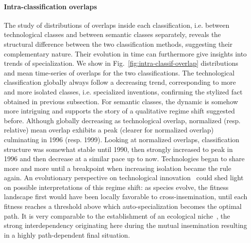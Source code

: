 \documentclass[12pt,twoside,a4paper]{article}
\begin{document}
\paragraph{Intra-classification overlaps}

The study of distributions of overlaps inside each classification, i.e. between technological classes and between semantic classes separately, reveals the structural difference between the two classification methods, suggesting their complementary nature. Their evolution in time can furthermore give insights into trends of specialization. We show in Fig.~\ref{fig:intra-classif-overlap} distributions and mean time-series of overlaps for the two classifications. The technological classification globally always follow a decreasing trend, corresponding to more and more isolated classes, i.e. specialized inventions, confirming the stylized fact obtained in previous subsection. For semantic classes, the dynamic is somehow more intriguing and supports the story of a qualitative regime shift suggested before. Although globally decreasing as technological overlap, normalized (resp. relative) mean overlap exhibits a peak (clearer for normalized overlap) culminating in 1996 (resp. 1999). Looking at normalized overlaps, classification structure was somewhat stable until 1990, then strongly increased to peak in 1996 and then decrease at a similar pace up to now. Technologies began to share more and more until a breakpoint when increasing isolation became the rule again. An evolutionary perspective on technological innovation~\cite{ziman2003technological} could shed light on possible interpretations of this regime shift: as species evolve, the fitness landscape first would have been locally favorable to cross-insemination, until each fitness reaches a threshold above which auto-specialization becomes the optimal path. It is very comparable to the establishment of an ecological niche~\cite{holland2012signals}, the strong interdependency originating here during the mutual insemination resulting in a highly path-dependent final situation. 
\end{document}
